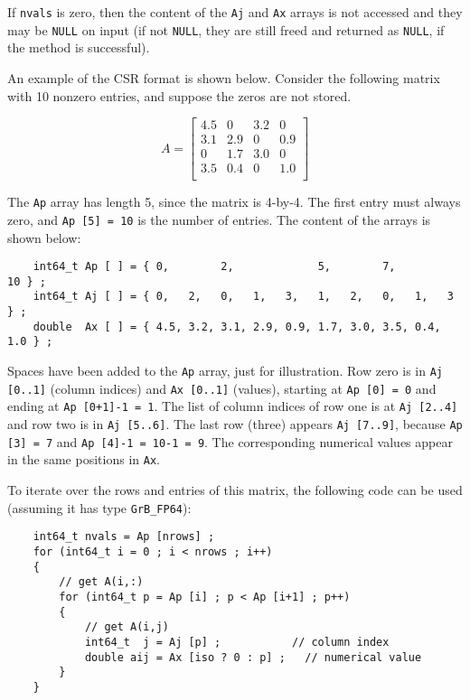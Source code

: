 \documentclass[12pt]{article}
\begin{document}
{If \verb'nvals' is zero, then the content of the \verb'Aj' and \verb'Ax' arrays
is not accessed and they may be \verb'NULL' on input (if not \verb'NULL', they
are still freed and returned as \verb'NULL', if the method is successful).

An example of the CSR format is shown below.  Consider the following
matrix with 10 nonzero entries, and suppose the zeros are not stored.

    \begin{equation}
    \label{eqn:Aexample}
    A = \left[
    \begin{array}{cccc}
    4.5 &   0 & 3.2 &   0 \\
    3.1 & 2.9 &  0  & 0.9 \\
     0  & 1.7 & 3.0 &   0 \\
    3.5 & 0.4 &  0  & 1.0 \\
    \end{array}
    \right]
    \end{equation}

The \verb'Ap' array has length 5, since the matrix is 4-by-4.  The first entry
must always zero, and \verb'Ap [5] = 10' is the number of entries.
The content of the arrays is shown below:

{\footnotesize
\begin{verbatim}
    int64_t Ap [ ] = { 0,        2,             5,        7,            10 } ;
    int64_t Aj [ ] = { 0,   2,   0,   1,   3,   1,   2,   0,   1,   3   } ;
    double  Ax [ ] = { 4.5, 3.2, 3.1, 2.9, 0.9, 1.7, 3.0, 3.5, 0.4, 1.0 } ; \end{verbatim} }

Spaces have been added to the \verb'Ap' array, just for illustration.  Row zero
is in \verb'Aj [0..1]' (column indices) and \verb'Ax [0..1]' (values), starting
at \verb'Ap [0] = 0' and ending at \verb'Ap [0+1]-1 = 1'.  The list of column
indices of row one is at \verb'Aj [2..4]' and row two is in \verb'Aj [5..6]'.
The last row (three) appears \verb'Aj [7..9]', because \verb'Ap [3] = 7' and
\verb'Ap [4]-1 = 10-1 = 9'.  The corresponding numerical values appear in the
same positions in \verb'Ax'.

To iterate over the rows and entries of this matrix, the following code can be
used
(assuming it has type \verb'GrB_FP64'):

    {\footnotesize
    \begin{verbatim}
    int64_t nvals = Ap [nrows] ;
    for (int64_t i = 0 ; i < nrows ; i++)
    {
        // get A(i,:)
        for (int64_t p = Ap [i] ; p < Ap [i+1] ; p++)
        {
            // get A(i,j)
            int64_t  j = Aj [p] ;           // column index
            double aij = Ax [iso ? 0 : p] ;   // numerical value
        }
    } \end{verbatim}}

}
\end{document}
